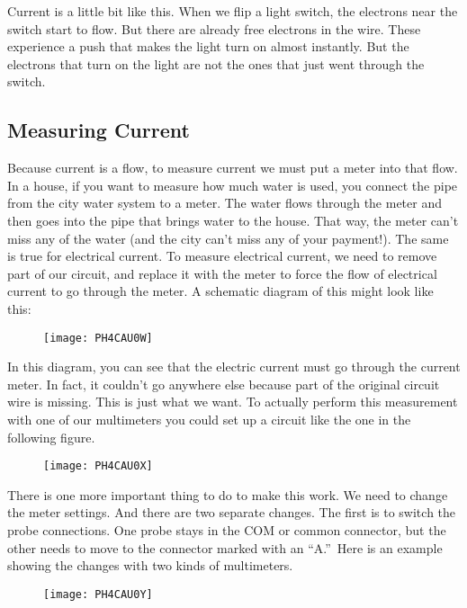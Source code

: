 Current is a little bit like this. When we flip a light switch, the
electrons near the switch start to flow. But there are already free
electrons in the wire. These experience a push that makes the light turn on
almost instantly. But the electrons that turn on the light are not the ones
that just went through the switch.

\subsection{Measuring Current}

Because current is a flow, to measure current we must put a meter into that
flow. In a house, if you want to measure how much water is used, you connect
the pipe from the city water system to a meter. The water flows through the
meter and then goes into the pipe that brings water to the house. That way,
the meter can't miss any of the water (and the city can't miss any of your
payment!). The same is true for electrical current. To measure electrical
current, we need to remove part of our circuit, and replace it with the
meter to force the flow of electrical current to go through the meter. A
schematic diagram of this might look like this: 

\begin{figure}[h!]
	\centering
    \texttt{[image: PH4CAU0W]}
\end{figure}

In this diagram, you can see that
the electric current must go through the current meter. In fact, it couldn't
go anywhere else because part of the original circuit wire is missing. This
is just what we want. To actually perform this measurement with one of our
multimeters you could set up a circuit like the one in the following figure. 

\begin{figure}[h!]
	\centering
    \texttt{[image: PH4CAU0X]}
\end{figure}

There is one more important thing
to do to make this work. We need to change the meter settings. And there are
two separate changes. The first is to switch the probe connections. One
probe stays in the COM or common connector, but the other needs to move to
the connector marked with an \textquotedblleft A.\textquotedblright\ Here is
an example showing the changes with two kinds of multimeters. 

\begin{figure}[h!]
    \centering
    \texttt{[image: PH4CAU0Y]}
\end{figure}

